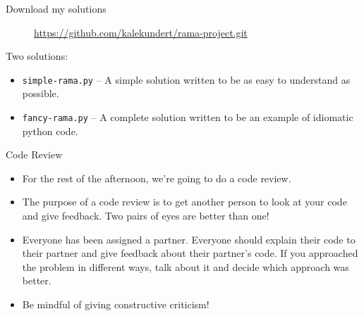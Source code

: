 \begin{frame}{Download my solutions}

 \begin{figure}[h]
  {\large \url{https://github.com/kalekundert/rama-project.git}}
 \end{figure}

 Two solutions:

 \begin{itemize}

  \item \texttt{simple-rama.py} -- A simple solution written to be as easy to 
   understand as possible.

  \item \texttt{fancy-rama.py} -- A complete solution written to be an example 
   of idiomatic python code.
  
 \end{itemize}

\end{frame}

\begin{frame}{Code Review}

 \begin{itemize}

  \item For the rest of the afternoon, we're going to do a code review.

  \item The purpose of a code review is to get another person to look at your 
   code and give feedback.  Two pairs of eyes are better than one!

  \item Everyone has been assigned a partner.  Everyone should explain their 
   code to their partner and give feedback about their partner's code.  If you 
   approached the problem in different ways, talk about it and decide which 
   approach was better.

  \item Be mindful of giving constructive criticism!

 \end{itemize}

\end{frame}

